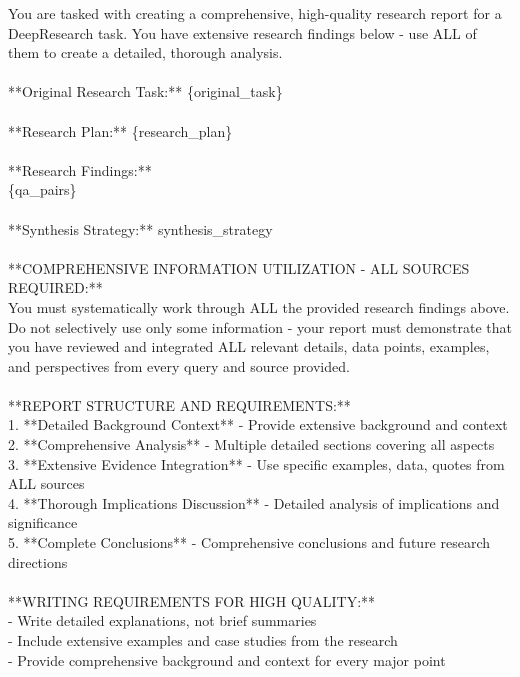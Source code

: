 \documentclass{article} %
\begin{document}
\begin{examplebox}
    \ttfamily
You are tasked with creating a comprehensive, high-quality research report for a DeepResearch task. You have extensive research findings below - use ALL of them to create a detailed, thorough analysis.\\
\\
**Original Research Task:** \{original\_task\}\\
\\
**Research Plan:** \{research\_plan\}\\
\\
**Research Findings:**\\
\{qa\_pairs\}\\
\\
**Synthesis Strategy:** {synthesis\_strategy}\\
\\
**COMPREHENSIVE INFORMATION UTILIZATION - ALL SOURCES REQUIRED:**\\
You must systematically work through ALL the provided research findings above. Do not selectively use only some information - your report must demonstrate that you have reviewed and integrated ALL relevant details, data points, examples, and perspectives from every query and source provided.\\
\\
**REPORT STRUCTURE AND REQUIREMENTS:**\\
1. **Detailed Background Context** - Provide extensive background and context\\
2. **Comprehensive Analysis** - Multiple detailed sections covering all aspects\\
3. **Extensive Evidence Integration** - Use specific examples, data, quotes from ALL sources\\
4. **Thorough Implications Discussion** - Detailed analysis of implications and significance\\
5. **Complete Conclusions** - Comprehensive conclusions and future research directions\\
\\
**WRITING REQUIREMENTS FOR HIGH QUALITY:**\\
- Write detailed explanations, not brief summaries\\
- Include extensive examples and case studies from the research\\
- Provide comprehensive background and context for every major point\\

\end{examplebox}
\end{document}
